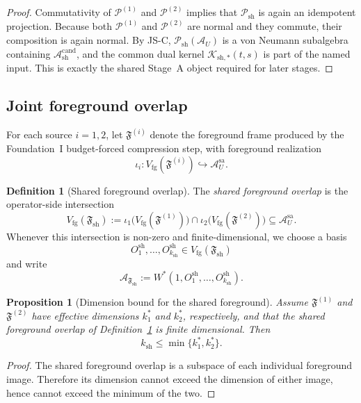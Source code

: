 \documentclass[12pt]{article}
\newtheorem{proposition}[theorem]{Proposition}
\theoremstyle{definition}
\newtheorem{definition}[theorem]{Definition}
\theoremstyle{remark}
\begin{document}
\begin{proof}
Commutativity of \(\mathcal P^{(1)}\) and \(\mathcal P^{(2)}\) implies
that \(\mathcal P_{\mathrm{sh}}\) is again an idempotent projection.
Because both \(\mathcal P^{(1)}\) and \(\mathcal P^{(2)}\) are normal
and they commute, their composition is again normal. By JS-C,
\(\mathcal P_{\mathrm{sh}}(\mathcal A_U)\) is a von Neumann subalgebra
containing \(\mathcal A_{\mathrm{sh}}^{\mathrm{cand}}\), and the common
dual kernel \(\mathcal K_{\mathrm{sh},*}(t,s)\) is part of the named
input. This is exactly the shared Stage~A object required for later
stages.
\end{proof}

\subsection{Joint foreground overlap}

For each source \(i=1,2\), let
\(\mathfrak F^{(i)}\) denote the foreground frame produced by the
Foundation~I budget-forced compression step, with foreground realization
\[
\iota_i:V_{\mathrm{fg}}(\mathfrak F^{(i)})\hookrightarrow
\mathcal A_U^{\mathrm{sa}}.
\]

\begin{definition}[Shared foreground overlap]
\label{def:sharedfg}
The \emph{shared foreground overlap} is the operator-side intersection
\[
V_{\mathrm{fg}}(\mathfrak F_{\mathrm{sh}})
:=
\iota_1\bigl(V_{\mathrm{fg}}(\mathfrak F^{(1)})\bigr)
\cap
\iota_2\bigl(V_{\mathrm{fg}}(\mathfrak F^{(2)})\bigr)
\subseteq
\mathcal A_U^{\mathrm{sa}}.
\]
Whenever this intersection is non-zero and finite-dimensional, we choose
a basis
\[
O_1^{\mathrm{sh}},\dots,O_{k_{\mathrm{sh}}}^{\mathrm{sh}}
\in
V_{\mathrm{fg}}(\mathfrak F_{\mathrm{sh}})
\]
and write
\[
\mathcal A_{\mathfrak F_{\mathrm{sh}}}
:=
W^*(1,O_1^{\mathrm{sh}},\dots,O_{k_{\mathrm{sh}}}^{\mathrm{sh}}).
\]
\end{definition}

\begin{proposition}[Dimension bound for the shared foreground]
\label{prop:sharedfgdim}
Assume \(\mathfrak F^{(1)}\) and \(\mathfrak F^{(2)}\) have effective
dimensions \(k_1^*\) and \(k_2^*\), respectively, and that the shared
foreground overlap of Definition~\ref{def:sharedfg} is finite
dimensional. Then
\[
k_{\mathrm{sh}}
\le
\min\{k_1^*,k_2^*\}.
\]
\end{proposition}

\begin{proof}
The shared foreground overlap is a subspace of each individual
foreground image. Therefore its dimension cannot exceed the dimension of
either image, hence cannot exceed the minimum of the two.
\end{proof}
\end{document}
